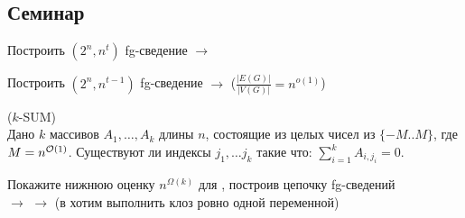 \subsection{Семинар}

\begin{exerc}
    Построить $(2^n, n^t)$ fg-сведение  $\to$ 
\end{exerc}

\begin{exerc}
    Построить $(2^n, n^{t - 1})$ fg-сведение  $\to$  ($\frac{|E(G)|}{|V(G)|} = n^{o(1)}$)
\end{exerc}

\begin{problem}($k$-SUM)\\
   Дано $k$ массивов $A_1, \dots, A_k$ длины $n$, состоящие из целых чисел из $\{-M..M\}$, где $M = n^{\mathcal{O}(1)}$. Существуют ли индексы $j_1, \dots j_k$ такие что: $\sum\limits_{i = 1}^k A_{i, j_i} = 0$.
\end{problem}

\begin{exerc}
    Покажите нижнюю оценку $n^{\Omega(k)}$ для , построив цепочку fg-сведений\\  $\to$  $\to$  (в  хотим выполнить клоз ровно одной переменной)
\end{exerc}


